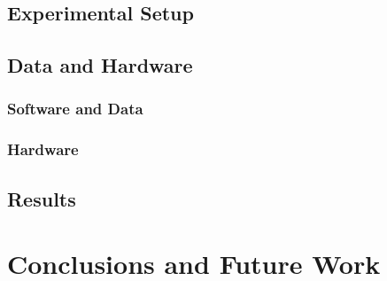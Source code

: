 \subsection{Experimental Setup}
\label{subsec:exp_setup}

\subsection{Data and Hardware}
\label{subsec:hardware}

\subsubsection{Software and Data}
\label{subsubsec:software}

\subsubsection{Hardware}
\label{subsubsec:hardware}

\subsection{Results}
\label{subsec:results}

\section{Conclusions and Future Work}
\label{sec:discussion_conclusion}




